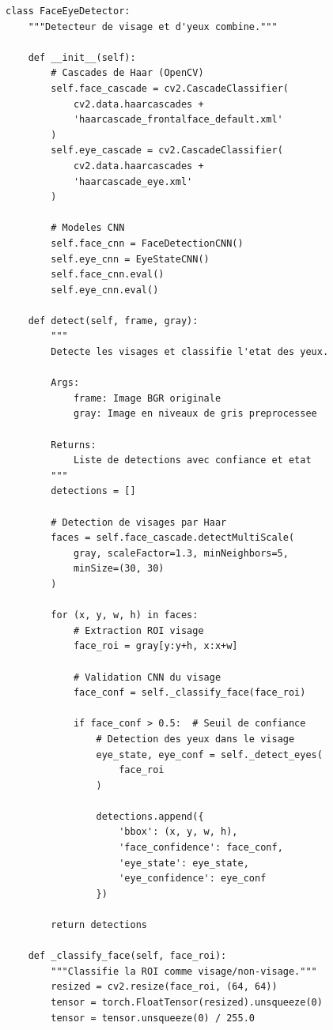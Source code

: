\begin{lstlisting}[style=pythonstyle, caption={Module de détection visage et yeux.}, label={lst:face_detection}]
class FaceEyeDetector:
    """Detecteur de visage et d'yeux combine."""
    
    def __init__(self):
        # Cascades de Haar (OpenCV)
        self.face_cascade = cv2.CascadeClassifier(
            cv2.data.haarcascades + 
            'haarcascade_frontalface_default.xml'
        )
        self.eye_cascade = cv2.CascadeClassifier(
            cv2.data.haarcascades + 
            'haarcascade_eye.xml'
        )
        
        # Modeles CNN
        self.face_cnn = FaceDetectionCNN()
        self.eye_cnn = EyeStateCNN()
        self.face_cnn.eval()
        self.eye_cnn.eval()
    
    def detect(self, frame, gray):
        """
        Detecte les visages et classifie l'etat des yeux.
        
        Args:
            frame: Image BGR originale
            gray: Image en niveaux de gris preprocessee
            
        Returns:
            Liste de detections avec confiance et etat
        """
        detections = []
        
        # Detection de visages par Haar
        faces = self.face_cascade.detectMultiScale(
            gray, scaleFactor=1.3, minNeighbors=5,
            minSize=(30, 30)
        )
        
        for (x, y, w, h) in faces:
            # Extraction ROI visage
            face_roi = gray[y:y+h, x:x+w]
            
            # Validation CNN du visage
            face_conf = self._classify_face(face_roi)
            
            if face_conf > 0.5:  # Seuil de confiance
                # Detection des yeux dans le visage
                eye_state, eye_conf = self._detect_eyes(
                    face_roi
                )
                
                detections.append({
                    'bbox': (x, y, w, h),
                    'face_confidence': face_conf,
                    'eye_state': eye_state,
                    'eye_confidence': eye_conf
                })
        
        return detections
    
    def _classify_face(self, face_roi):
        """Classifie la ROI comme visage/non-visage."""
        resized = cv2.resize(face_roi, (64, 64))
        tensor = torch.FloatTensor(resized).unsqueeze(0)
        tensor = tensor.unsqueeze(0) / 255.0
        

\end{lstlisting}
